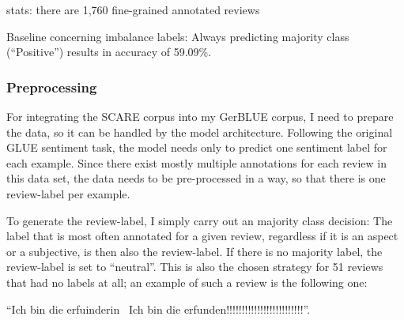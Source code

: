 stats: there are 1,760 fine-grained annotated reviews

Baseline concerning imbalance labels: Always predicting majority class (``Positive'') results
in accuracy of 59.09\%.




\subsubsection{Preprocessing}

For integrating the SCARE corpus into my GerBLUE corpus, I need to prepare the data, so it can be
handled by the model architecture.
Following the original GLUE sentiment task, the model needs only to predict one sentiment label
for each example.
Since there exist mostly multiple annotations for each review in this data set, the data needs to
be pre-processed in a way, so that there is one review-label per example.

To generate the review-label, I simply carry out an majority class decision:
The label that is most often annotated for a given review, regardless if it is an aspect or a
subjective, is then also the review-label.
If there is no majority label, the review-label is set to ``neutral''.
This is also the chosen strategy for 51 reviews that had no labels at all; an example of such a
review is the following one:

\begin{examples}
  \item ``Ich bin die erfuinderin \textbar \textbar\ Ich bin die erfunden!!!!!!!!!!!!!!!!!!!!!!!!!''.
\end{examples}


